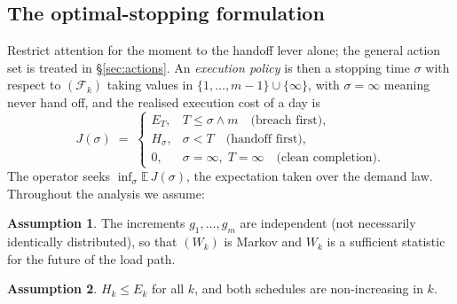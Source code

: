 \documentclass[preprint,authoryear,12pt]{elsarticle}
\theoremstyle{definition}
\newtheorem{assumption}{Assumption}
\theoremstyle{remark}
\begin{document}
\subsection{The optimal-stopping formulation}\label{sec:formulation}

Restrict attention for the moment to the handoff lever alone; the
general action set is treated in \S\ref{sec:actions}. An
\emph{execution policy} is then a stopping time $\sigma$ with respect to
$(\mathcal F_k)$ taking values in $\{1,\dots,m-1\} \cup \{\infty\}$,
with $\sigma = \infty$ meaning never hand off, and the realised
execution cost of a day is
\begin{equation}\label{eq:cost}
  J(\sigma) \;=\;
  \begin{cases}
    E_T, & T \le \sigma \wedge m \quad\text{(breach first)},\\[2pt]
    H_\sigma, & \sigma < T \quad\text{(handoff first)},\\[2pt]
    0, & \sigma = \infty,\; T = \infty
    \quad\text{(clean completion)} .
  \end{cases}
\end{equation}
The operator seeks $\inf_\sigma \mathbb E\, J(\sigma)$, the expectation
taken over the demand law. Throughout the analysis we assume:

\begin{assumption}\label{ass:markov}
The increments $g_1,\dots,g_m$ are independent (not necessarily
identically distributed), so that $(W_k)$ is Markov and $W_k$ is a
sufficient statistic for the future of the load path.
\end{assumption}

\begin{assumption}\label{ass:prices}
$H_k \le E_k$ for all $k$, and both schedules are non-increasing in $k$.
\end{assumption}
\end{document}
